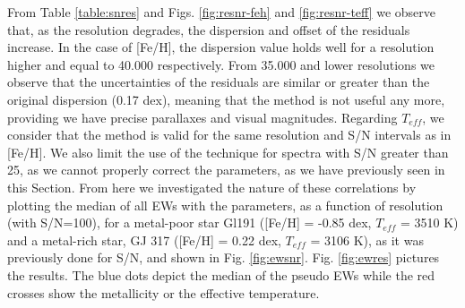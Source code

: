 \documentclass{aa}
\begin{document}
From Table \ref{table:snres} and Figs. \ref{fig:resnr-feh} and \ref{fig:resnr-teff} we observe that, as the resolution degrades, the dispersion and offset of the residuals increase. In the case of [Fe/H], the dispersion value holds well for a resolution higher and equal to 40.000 respectively. From 35.000 and lower resolutions we observe that the uncertainties of the residuals are similar or greater than the original dispersion (0.17 dex), meaning that the method is not useful any more, providing we have precise parallaxes and visual magnitudes. %
Regarding $T_{eff}$, we consider that the method is valid for the same resolution and S/N intervals as in [Fe/H]. We also limit the use of the technique for spectra with S/N greater than 25, as we cannot properly correct the parameters, as we have previously seen in this Section. %
From here we investigated the nature of these correlations by plotting the median of all EWs with the parameters, as a function of resolution (with S/N=100), for a metal-poor star Gl191 ([Fe/H] = -0.85 dex, $T_{eff}$ = 3510 K) and a metal-rich star, GJ 317 ([Fe/H] = 0.22 dex, $T_{eff}$ = 3106 K), as it was previously done for S/N, and shown in Fig. \ref{fig:ewsnr}. Fig. \ref{fig:ewres} pictures the results. The blue dots depict the median of the pseudo EWs while the red crosses show the metallicity or the effective temperature.
\end{document}
